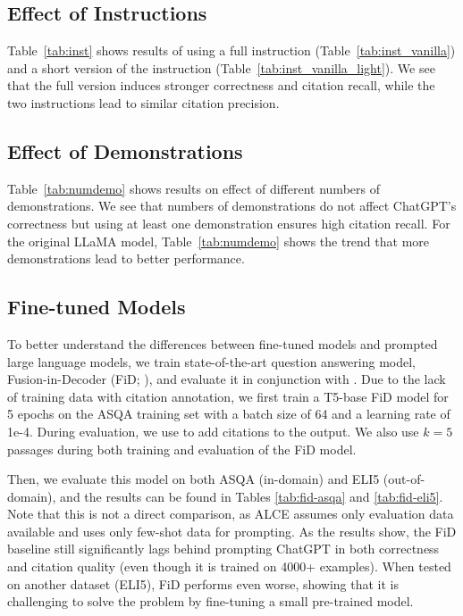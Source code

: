 \documentclass[11pt]{article}
\newcommand{\posthoc}{{\sc{PostCite}}}
\newcommand{\revise}[1]{{{#1}}}
\begin{document}
\subsection{Effect of Instructions}
\label{sec:inst}

Table~\ref{tab:inst} shows results of using a full instruction (Table~\ref{tab:inst_vanilla}) and a short version of the instruction (Table~\ref{tab:inst_vanilla_light}).
We see that the full version induces stronger correctness and citation recall, while the two instructions lead to similar citation precision.

\subsection{Effect of Demonstrations}

\label{sec:demo}



Table~\ref{tab:numdemo}
shows results on effect of different numbers of demonstrations.
We see that 
numbers of demonstrations do not affect ChatGPT's correctness but
using at least one demonstration
ensures high citation recall.
For the original LLaMA model, Table~\ref{tab:numdemo} shows the trend that more demonstrations lead to better performance.

\subsection{Fine-tuned Models}
\label{sec:fid}

\revise{
To better understand the differences between fine-tuned models and prompted large language models, we train state-of-the-art question answering model, Fusion-in-Decoder (FiD; \citet{izacard-grave-2021-leveraging}), and evaluate it in conjunction with \posthoc{}.
Due to the lack of training data with citation annotation, we first train a T5-base FiD model for 5 epochs on the ASQA training set with a batch size of 64 and a learning rate of 1e-4.
During evaluation, we use \posthoc{} to add citations to the output. 
We also use $k=5$ passages during both training and evaluation of the FiD model. 

Then, we evaluate this model on both ASQA (in-domain) and ELI5 (out-of-domain), and the results can be found in Tables \ref{tab:fid-asqa} and \ref{tab:fid-eli5}.
Note that this is not a direct comparison, as ALCE assumes only evaluation data available and uses only few-shot data for prompting. 
As the results show, the FiD baseline still significantly lags behind prompting ChatGPT in both correctness and citation quality (even though it is trained on 4000+ examples). 
When tested on another dataset (ELI5), FiD performs even worse, showing that it is challenging to solve the problem by fine-tuning a small pre-trained model. 
}
 
\end{document}
